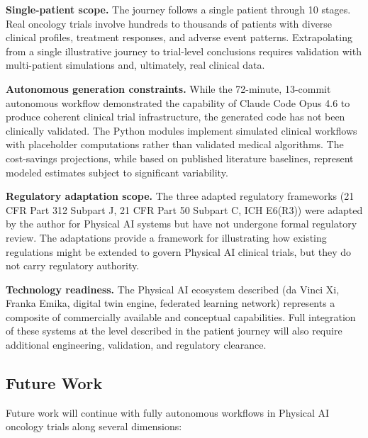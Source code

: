 \textbf{Single-patient scope.} The journey follows a single patient through 10 stages. Real oncology trials involve hundreds to thousands of patients with diverse clinical profiles, treatment responses, and adverse event patterns. Extrapolating from a single illustrative journey to trial-level conclusions requires validation with multi-patient simulations and, ultimately, real clinical data.

\textbf{Autonomous generation constraints.} While the 72-minute, 13-commit autonomous workflow demonstrated the capability of Claude Code Opus 4.6 to produce coherent clinical trial infrastructure, the generated code has not been clinically validated. The Python modules implement simulated clinical workflows with placeholder computations rather than validated medical algorithms. The cost-savings projections, while based on published literature baselines, represent modeled estimates subject to significant variability.

\textbf{Regulatory adaptation scope.} The three adapted regulatory frameworks (21 CFR Part 312 Subpart J, 21 CFR Part 50 Subpart C, ICH E6(R3)) were adapted by the author for Physical AI systems but have not undergone formal regulatory review. The adaptations provide a framework for illustrating how existing regulations might be extended to govern Physical AI clinical trials, but they do not carry regulatory authority.

\textbf{Technology readiness.} The Physical AI ecosystem described (da Vinci Xi, Franka Emika, digital twin engine, federated learning network) represents a composite of commercially available and conceptual capabilities. Full integration of these systems at the level described in the patient journey will also require additional engineering, validation, and regulatory clearance.

\subsection{Future Work}

Future work will continue with fully autonomous workflows in Physical AI oncology trials along several dimensions:

